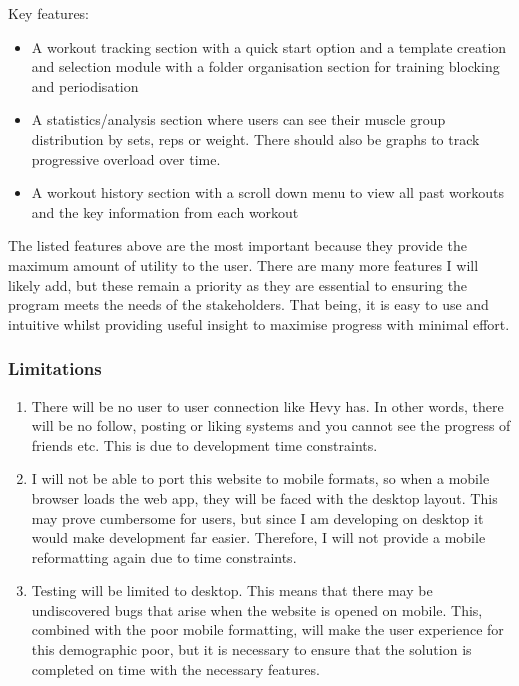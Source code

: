 \documentclass{article}
\begin{document}
Key features: 
\begin{itemize}
  \item A workout tracking section with a quick start option and a template creation and selection module with a folder organisation section for training blocking and periodisation
  \item A statistics/analysis section where users can see their muscle group distribution by sets, reps or weight. There should also be graphs to track progressive overload over time. 
  \item A workout history section with a scroll down menu to view all past workouts and the key information from each workout 
\end{itemize}

The listed features above are the most important because they provide the maximum amount of utility to the user. There are many more features I will likely add, but these remain a priority as they are essential to ensuring the program meets the needs of the stakeholders. That being, it is easy to use and intuitive whilst providing useful insight to maximise progress with minimal effort.

\subsubsection{Limitations}

\begin{enumerate}
  \item There will be no user to user connection like Hevy has. In other words, there will be no follow, posting or liking systems and you cannot see the progress of friends etc. This is due to development time constraints.
  \item I will not be able to port this website to mobile formats, so when a mobile browser loads the web app, they will be faced with the desktop layout. This may prove cumbersome for users, but since I am developing on desktop it would make development far easier. Therefore, I will not provide a mobile reformatting again due to time constraints. 
  \item Testing will be limited to desktop. This means that there may be undiscovered bugs that arise when the website is opened on mobile. This, combined with the poor mobile formatting, will make the user experience for this demographic poor, but it is necessary to ensure that the solution is completed on time with the necessary features. 
\end{enumerate}
\end{document}

